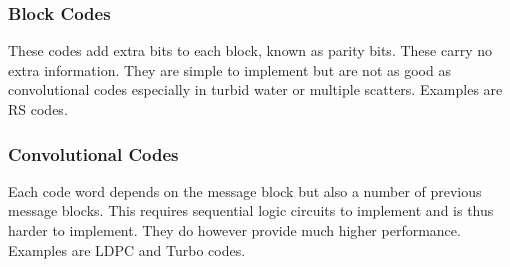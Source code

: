 \subsubsection{Block Codes}
These codes add extra bits to each block, known as parity bits. These carry
no extra information. They are simple to implement but are not as good as
convolutional codes especially in turbid water or multiple scatters. Examples
are \ac{RS} codes.

\subsubsection{Convolutional Codes}
Each code word depends on the message block but also a number of previous
message blocks. This requires sequential logic circuits to implement and is
thus harder to implement. They do however provide much higher performance.
Examples are \ac{LDPC} and Turbo codes.
